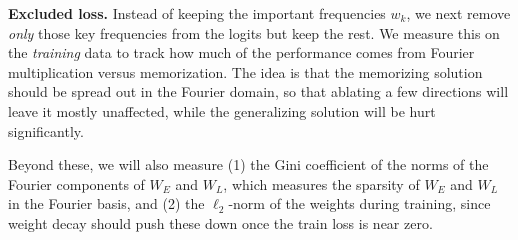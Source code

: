 \documentclass{article} %
\newcommand{\cosp}[1]{\cos \left ( #1 \right )}
\begin{document}
\textbf{Excluded loss.} 
Instead of keeping the important frequencies $w_k$, we next remove \emph{only} those key frequencies from the logits but keep the rest.
We measure this on the \emph{training} data to track how much of the performance comes from Fourier multiplication versus memorization. The idea is that the memorizing solution should be spread out in the Fourier domain, so that ablating a few directions will leave it mostly unaffected, while the generalizing solution will be hurt significantly. %




Beyond these, we will also measure (1) the Gini coefficient \citep{hurley2009comparing} of the norms of the Fourier components of $W_E$ and $W_L$, which measures the sparsity of $W_E$ and $W_L$ in the Fourier basis, and (2) the $\ell_2$-norm of the weights during training, since weight decay should push these down once the train loss is near zero.


\end{document}
